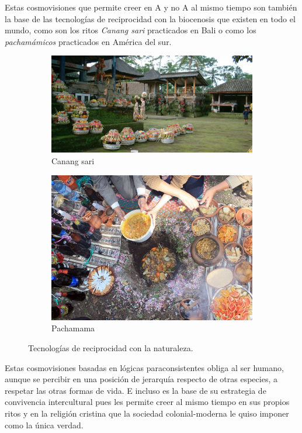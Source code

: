 \documentclass[a4paper,10pt]{book}
\theoremstyle{definition}
\begin{document}
Estas cosmovisiones que permite creer en A y no A al mismo tiempo son también la base de las tecnologías de reciprocidad con la biocenosis que existen en todo el mundo, como son los ritos \emph{Canang sari} practicados en Bali o como los \emph{pachamámicos} practicados en América del sur.
\begin{figure}[ht!]
    \centering
    \begin{subfigure}[b]{0.45\textwidth}
    \centering
    \includegraphics[width=\linewidth]{static/bali-offerings}
    \caption{Canang sari}
    \label{}
    \end{subfigure}
    \begin{subfigure}[b]{0.33\textwidth}
    \centering
    \includegraphics[width=\linewidth]{static/pachamama}
    \caption{Pachamama}
    \label{}
    \end{subfigure}
    \caption{Tecnologías de reciprocidad con la naturaleza.}
    \label{fig:mito}
\end{figure}
Estas cosmovisiones basadas en lógicas paraconsistentes obliga al ser humano, aunque se percibir en una posición de jerarquía respecto de otras especies, a respetar las otras formas de vida.
E incluso es la base de su estrategia de convivencia intercultural pues les permite creer al mismo tiempo en sus propios ritos y en la religión cristina que la sociedad colonial-moderna le quiso imponer como la única verdad.
\end{document}

